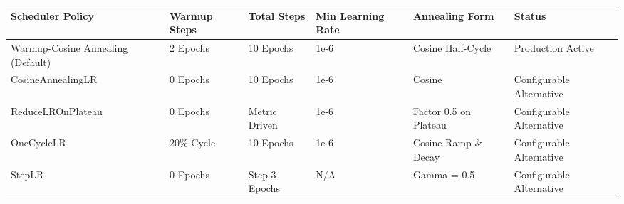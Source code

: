 \begin{tabular}{llllll}
\toprule
Scheduler Policy & Warmup Steps & Total Steps & Min Learning Rate & Annealing Form & Status \\
\midrule
Warmup-Cosine Annealing (Default) & 2 Epochs & 10 Epochs & 1e-6 & Cosine Half-Cycle & Production Active \\
CosineAnnealingLR & 0 Epochs & 10 Epochs & 1e-6 & Cosine & Configurable Alternative \\
ReduceLROnPlateau & 0 Epochs & Metric Driven & 1e-6 & Factor 0.5 on Plateau & Configurable Alternative \\
OneCycleLR & 20\% Cycle & 10 Epochs & 1e-6 & Cosine Ramp \& Decay & Configurable Alternative \\
StepLR & 0 Epochs & Step 3 Epochs & N/A & Gamma = 0.5 & Configurable Alternative \\
\bottomrule
\end{tabular}
